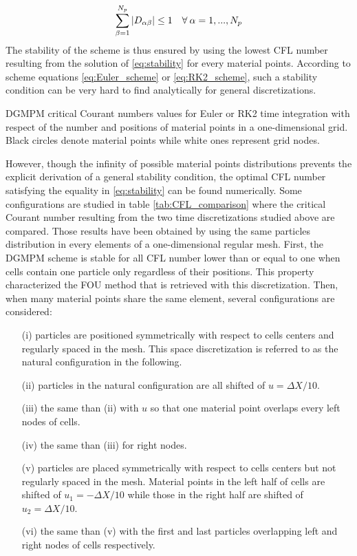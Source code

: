 \begin{equation}
  \label{eq:stability} \sum_{\beta=1}^{N_p} \left\vert D_{\alpha\beta}\right\vert \leq 1 \quad \forall \: \alpha = 1,...,N_p
\end{equation}
The stability of the scheme is thus ensured by using the lowest CFL number resulting from the solution of \eqref{eq:stability} for every material points. According to scheme equations \eqref{eq:Euler_scheme} or \eqref{eq:RK2_scheme}, such a stability condition can be very hard to find analytically for general discretizations. 
\begin{table}[h]
  \centering
  
  \caption{DGMPM critical Courant numbers values for Euler or RK2 time integration with respect of the number and positions of material points in a one-dimensional grid. Black circles denote material points while white ones represent grid nodes.}
  \label{tab:CFL_comparison}
\end{table}
However, though the infinity of possible material points distributions prevents the explicit derivation of a general stability condition, the optimal CFL number satisfying the equality in \eqref{eq:stability} can be found numerically. Some configurations are studied in table \ref{tab:CFL_comparison} where the critical Courant number resulting from the two time discretizations studied above are compared. Those results have been obtained by using the same particles distribution in every elements of a one-dimensional regular mesh. 
First, the DGMPM scheme is stable for all CFL number lower than or equal to one when cells contain one particle only regardless of their positions. This property characterized the FOU method that is retrieved with this discretization. 
Then, when many material points share the same element, several configurations are considered:
\begin{itemize}
\item[(i)] particles are positioned symmetrically with respect to cells centers and regularly spaced in the mesh. This space discretization is referred to as the natural configuration in the following.
\item[(ii)] particles in the natural configuration are all shifted of $u=\Delta X/10$.
\item[(iii)] the same than (ii) with $u$ so that one material point overlaps every left nodes of cells.
\item[(iv)] the same than (iii) for right nodes.
\item[(v)] particles are placed symmetrically with respect to cells centers but not regularly spaced in the mesh. Material points in the left half of cells are shifted of $u_1=-\Delta X/10$ while those in the right half are shifted of $u_2=\Delta X/10$.
\item[(vi)] the same than (v) with the first and last particles overlapping left and right nodes of cells respectively.
\end{itemize}
